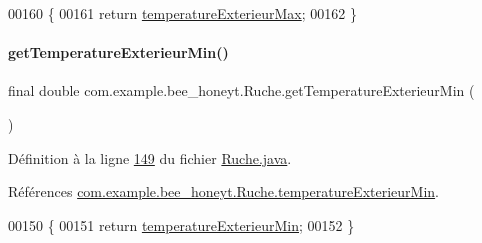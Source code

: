 \begin{DoxyCode}
00160     \{
00161         \textcolor{keywordflow}{return} \hyperlink{classcom_1_1example_1_1bee__honeyt_1_1_ruche_afd45ecd796457b633615488195153114}{temperatureExterieurMax};
00162     \}
\end{DoxyCode}
\mbox{\label{classcom_1_1example_1_1bee__honeyt_1_1_ruche_ada637700d05524a98a143074c43acb7e}} 
\paragraph{\texorpdfstring{get\+Temperature\+Exterieur\+Min()}{getTemperatureExterieurMin()}}
{\footnotesize\ttfamily final double com.\+example.\+bee\+\_\+honeyt.\+Ruche.\+get\+Temperature\+Exterieur\+Min (\begin{DoxyParamCaption}{ }\end{DoxyParamCaption})}



Définition à la ligne \hyperlink{_ruche_8java_source_l00149}{149} du fichier \hyperlink{_ruche_8java_source}{Ruche.\+java}.



Références \hyperlink{_ruche_8java_source_l00027}{com.\+example.\+bee\+\_\+honeyt.\+Ruche.\+temperature\+Exterieur\+Min}.


\begin{DoxyCode}
00150     \{
00151         \textcolor{keywordflow}{return} \hyperlink{classcom_1_1example_1_1bee__honeyt_1_1_ruche_a6e88eae7cc58b7c7ca3846d789fe1c2b}{temperatureExterieurMin};
00152     \}
\end{DoxyCode}
\mbox{\label{classcom_1_1example_1_1bee__honeyt_1_1_ruche_a460323968438c2f0ba77b4d7e92c53bd}} 
